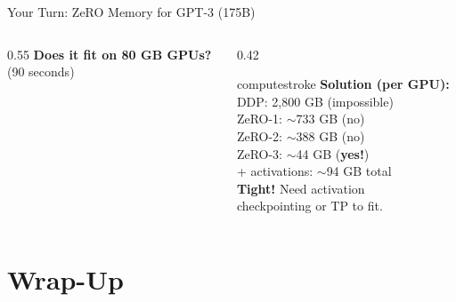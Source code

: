 \documentclass[aspectratio=169, 12pt]{beamer}
\begin{document}
\begin{frame}{Your Turn: ZeRO Memory for GPT-3 (175B)}
\begin{columns}[T]
\begin{column}{0.55\textwidth}
    \vspace{0.05cm}
    \textbf{Does it fit on 80 GB GPUs?}\\
    {\footnotesize\textcolor{midgray}{(90 seconds)}}
  \end{column}
  \begin{column}{0.42\textwidth}
    \pause
    \begin{mlsyscard}{computestroke}
    {\scriptsize \textbf{Solution (per GPU):}\\
    DDP: 2,800 GB (impossible)\\
    ZeRO-1: $\sim$733 GB (\textcolor{errorstroke}{no})\\
    ZeRO-2: $\sim$388 GB (\textcolor{errorstroke}{no})\\
    ZeRO-3: $\sim$44 GB (\textcolor{datastroke}{\textbf{yes!}})\\[0.1cm]
    + activations: $\sim$94 GB total\\
    \textcolor{errorstroke}{\textbf{Tight!}} Need activation\\
    checkpointing or TP to fit.}
    \end{mlsyscard}
  \end{column}
\end{columns}

\end{frame}

\section{Wrap-Up}
\end{document}
